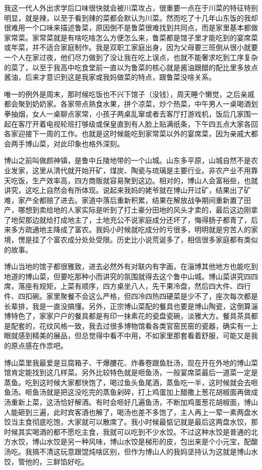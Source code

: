 \documentclass[
]{book}
\begin{document}
我这一代人外出求学后口味很快就会被川菜攻占，很重要一点在于川菜的特征特别明显，就是辣，以至于看到辣的菜都会默认为川菜。然而吃了十几年山东饭的我却很难用一个口味来描述鲁菜，原因倒不是鲁菜很难找到共同点，而是家里基本都做家常菜。家常菜就是有啥吃啥怎么方便怎么来，鲁菜都是馆子里才能吃到的宴席菜或年菜，并不适合家庭制作。我是双职工家庭出身，因为父母要三班倒从很小就要一个人在家过夜，他们尽力做到了没让我在吃上误点，也就不能奢求吃到工序复杂的菜了，以至于我高中吃食堂前一直以为鲁菜的核心就是酱油跟醋的配比里多放点酱油，后来才意识到这是我家或我妈做菜的特点，跟鲁菜没啥关系。

唯一的例外是周末，那时候吃饭也不兴下馆子（没钱），周天睡个懒觉，之后亲戚都会聚到奶奶家。各家带点熟食水果，拼个凉菜，炒个热菜，中午男人一桌喝酒划拳抽烟，女人一桌聊点家常，小孩子两桌乱窜或者去客厅打游戏机，饭后几家围一起在客厅开着电视轮班打够级或保皇直到有人脸上贴满纸条，下午四五点大家各回各家迎接下一周的工作。也就是这时候能吃到家常菜以外的宴席菜，因为亲戚大都会两手博山菜，对此印象也格外深刻。

博山之前叫做颜神镇，是鲁中丘陵地带的一个山城。山东多平原，山城自然不是农业发家，这里从清代就开始开矿，煤炭、陶瓷与琉璃是主要行业。非农产业不用靠天吃饭，生产效率高，四方商贩就容易聚到这边。相对的，博山人会富裕些，也就讲究，这吃上自然会有所体现。说起来我妈的姥爷就在博山开过矿，结果出了矿难，家产全都赔了进去。家道中落后重新积累，结果在解放战争期间重新置了田产，哪想到卖给地的人家实际是听到了打土豪分田地的风头才卖的，最后这边刚拿了地契那边就给打成地主了，土地充公不说家庭成分还坏了，悔得肠子都青了，后来多方疏通地主降成了富农。我妈小时候就吃成分的亏很多，明明就是穷苦人的家境，愣是挂了个富农成分处处受限。历史比小说荒诞多了，相信很多家庭都有类似的故事。

博山当地的馆子都很雅致，进去必然外有对联内有字画，在淄博其他地方也能吃到地道的博山菜，但要吃那种小而讲究的氛围就得去这个鲁中山城。博山菜讲究四四席，落座有规矩，上菜有顺序，四方桌坐八人，先干果冷盘，然后四大件、四行件、四扣碗。家里聚餐不会这么严格，但四冷四热四硬菜是少不了，座次每次都是长辈排，我是一直没搞懂。另外，正宗博山菜配的餐具也要是博山陶瓷，这倒算淄博特色了，家家户户的餐具都是有印一抹素花的瓷盘瓷碗，淡雅大方。餐具茶具都是配套的，花纹风格一致，我去过很多博物馆看各类官窑民窑的瓷器，确实有一上眼就感到精美的展品，但总觉得中看不中用，不如家里那套看着舒服，可能又是我的原点感在作祟吧。

博山菜里我最爱是豆腐箱子、干爆腰花、炸春卷跟鱼肚汤，现在开在外地的博山菜馆肯定能找到这几样菜。另外比较特色就是咂鱼汤，一般宴席菜最后一道菜一定是蒸鱼。吃到这时候大家都快饱了，喝过鱼头鱼尾酒，蒸鱼吃一半，这时候就会去咂鱼汤。咂鱼汤就是把这没吃完的蒸鱼剁碎，打上鸡蛋加上醋撒上葱花胡椒面再做成汤重新上菜，这汤恰好解酒。有时会咂好几遍鱼汤，不断加鸡蛋葱花胡椒面，博山人能砸到三遍，此时宾客酒也解了，喝汤也差不多饱了，主人再上一荤一素两盘水饺当主食彻底吃饱，大家就可以散席了。我小时候最惦记就是最后这两盘水饺，那时候其实喝酒的都不愿吃主食，我就可以吃到不少水饺。不过这种水饺是普通的北方水饺，博山水饺是另一种风味，博山水饺是梯形的皮，包出来是个小元宝，配酸汤吃。我搞不清这玩意跟馄炖啥区别，但作为博山人的我妈坚持认为这就是博山水饺，管他的，三鲜馅好吃。
\end{document}
